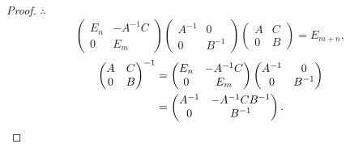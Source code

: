 \documentclass{ctexart}
\begin{document}
\begin{proof}
    $\therefore$
    \[\begin{pmatrix}
        E_n & -A^{-1}C \\
        0 & E_m
    \end{pmatrix}\begin{pmatrix}
        A^{-1} & 0 \\
        0 & B^{-1}
    \end{pmatrix}\begin{pmatrix}
        A & C \\
        0 & B
    \end{pmatrix}=E_{m+n},\]
    \begin{align*}
        \begin{pmatrix}
            A & C \\
            0 & B
        \end{pmatrix}^{-1}
        & =\begin{pmatrix}
                E_n & -A^{-1}C \\
                0 & E_m
            \end{pmatrix}\begin{pmatrix}
                A^{-1} & 0 \\
                0 & B^{-1}
            \end{pmatrix} \\
        & =\begin{pmatrix}
            A^{-1} & -A^{-1}CB^{-1} \\
            0 & B^{-1}
        \end{pmatrix}.\qedhere
    \end{align*}
\end{proof}
\end{document}
